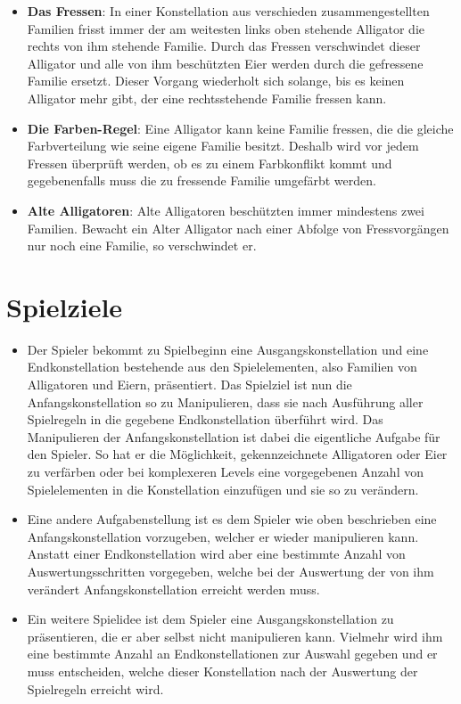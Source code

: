 	\begin{itemize}
	
	\item \textbf{Das Fressen}: In einer Konstellation aus verschieden zusammengestellten Familien frisst immer der am weitesten links oben stehende Alligator die rechts von ihm stehende Familie. Durch das Fressen verschwindet dieser Alligator und alle von ihm beschützten Eier werden durch die gefressene Familie ersetzt. Dieser Vorgang wiederholt sich solange, bis es keinen Alligator mehr gibt, der eine rechtsstehende Familie fressen kann.
	
	\item \textbf{Die Farben-Regel}: Eine Alligator kann keine Familie fressen, die die gleiche Farbverteilung wie seine eigene Familie besitzt.  Deshalb wird vor jedem Fressen überprüft werden, ob es zu einem Farbkonflikt kommt und gegebenenfalls muss die zu fressende Familie umgefärbt werden.
	
	\item \textbf{Alte Alligatoren}: Alte Alligatoren beschützten immer mindestens zwei Familien. Bewacht ein Alter Alligator nach einer Abfolge von Fressvorgängen nur noch eine Familie, so verschwindet er.
	
	\end{itemize}	
	
\section{Spielziele}
	
	\begin{itemize}
	
		\item Der Spieler bekommt zu Spielbeginn eine Ausgangskonstellation und eine Endkonstellation bestehende aus den Spielelementen, also Familien von Alligatoren und Eiern, präsentiert. Das Spielziel ist nun die Anfangskonstellation so zu Manipulieren, dass sie nach Ausführung aller Spielregeln in die gegebene Endkonstellation überführt wird. Das Manipulieren der Anfangskonstellation ist dabei die eigentliche Aufgabe für den Spieler. So hat er die Möglichkeit, gekennzeichnete Alligatoren oder Eier zu verfärben oder bei komplexeren Levels eine vorgegebenen Anzahl von Spielelementen in die Konstellation einzufügen und sie so zu verändern.
		
		\item Eine andere Aufgabenstellung ist es dem Spieler wie oben beschrieben eine Anfangskonstellation vorzugeben, welcher er wieder manipulieren kann. Anstatt einer Endkonstellation wird aber eine bestimmte Anzahl von Auswertungsschritten vorgegeben, welche bei der Auswertung der von ihm verändert Anfangskonstellation erreicht werden muss.
		
		\item Ein weitere Spielidee ist dem Spieler eine Ausgangskonstellation zu präsentieren, die er aber selbst nicht manipulieren kann. Vielmehr wird ihm eine bestimmte Anzahl an Endkonstellationen
zur Auswahl gegeben und er muss entscheiden, welche dieser Konstellation nach der Auswertung der Spielregeln erreicht wird.
		
	\end{itemize}

	
